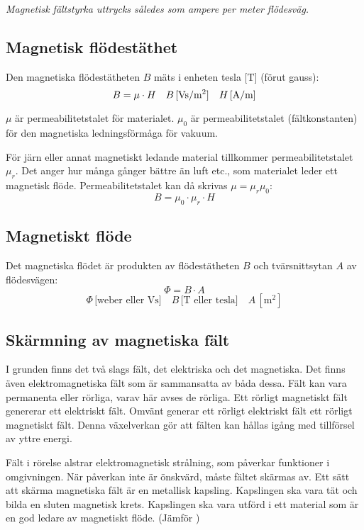 \emph{Magnetisk fältstyrka uttrycks således som ampere per meter flödesväg.}

\subsection{Magnetisk flödestäthet}

Den magnetiska flödestätheten \(B\) mäts i enheten tesla \(\text{[T]}\) (förut gauss):
\[B = \mu \cdot H \quad B\, \text{[Vs/m$ ^2 $]}\quad H\, \text{[A/m]}\]

\(\mu\) är permeabilitetstalet för materialet.
\(\mu_0\) är permeabilitetstalet (fältkonstanten) för den magnetiska
ledningsförmåga för vakuum.

För järn eller annat magnetiskt ledande material tillkommer permeabilitetstalet
\(\mu_r\).
Det anger hur många gånger bättre än luft etc., som materialet leder ett
magnetisk flöde.
Permeabilitetstalet kan då skrivas
\(\mu = \mu_r\mu_0\):
\[B = \mu_0 \cdot \mu_r \cdot H\]

\subsection{Magnetiskt flöde}

Det magnetiska flödet är produkten av flödestätheten \(B\) och tvärsnittsytan
\(A\) av flödesvägen:
\[\Phi = B \cdot A\]
\[\Phi\, \text{[weber eller Vs]}\quad B\, \text{[T eller tesla]} \quad A\, [\text{m}^2]\]

\subsection{Skärmning av magnetiska fält}
\label{elektromagnetisk skärmning}

I grunden finns det två slags fält, det elektriska och det magnetiska.
Det finns även elektromagnetiska fält som är sammansatta av båda dessa.
Fält kan vara permanenta eller rörliga, varav här avses de rörliga.
Ett rörligt magnetiskt fält genererar ett elektriskt fält.
Omvänt generar ett rörligt elektriskt fält ett rörligt magnetiskt fält.
Denna växelverkan gör att fälten kan hållas igång med tillförsel av yttre
energi.

Fält i rörelse alstrar elektromagnetisk strålning, som påverkar funktioner i
omgivningen.
När påverkan inte är önskvärd, måste fältet skärmas av.
Ett sätt att skärma magnetiska fält är en metallisk kapsling.
Kapslingen ska vara tät och bilda en sluten magnetisk krets.
Kapslingen ska vara utförd i ett material som är en god ledare av magnetiskt
flöde.
(Jämför )
